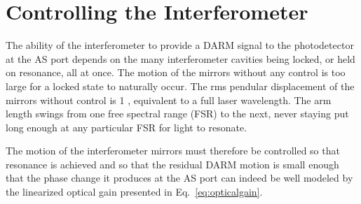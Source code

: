 







\section{Controlling the Interferometer}
The ability of the interferometer to provide a DARM signal to the
photodetector at the AS port depends on the many interferometer
cavities being locked, or held on resonance, all at once. The motion
of the mirrors without any control is too large for a locked state to
naturally occur. The rms pendular displacement of the mirrors without
control is 1 \micron, equivalent to a full laser wavelength. The arm
length swings from one free spectral range (FSR) to the next, never
staying put long enough at any particular FSR for light to
resonate.

The motion of the interferometer mirrors must therefore be controlled
so that resonance is achieved and so that the residual DARM motion is
small enough that the phase change it produces at the AS port can
indeed be well modeled by the linearized optical gain presented in
Eq.~\ref{eq:opticalgain}. 


